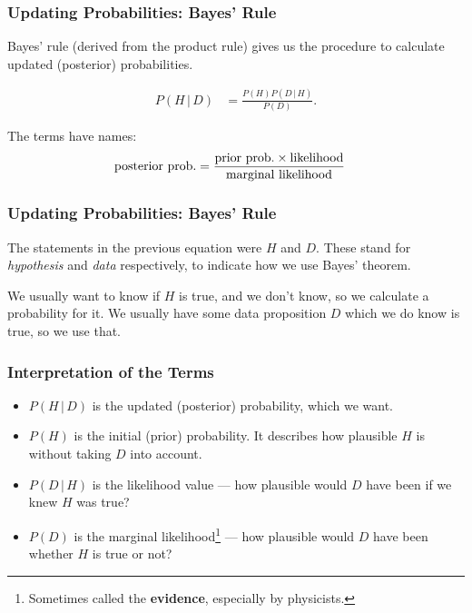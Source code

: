 \documentclass{beamer}
\newcommand{\given}{\,|\,}
\begin{document}
\begin{frame}
\frametitle{Updating Probabilities: Bayes' Rule}
Bayes' rule (derived from the product rule) gives us the procedure to
calculate updated (posterior) probabilities.

\begin{align}
P(H \given D) &= \frac{P(H) P(D\given H)}{P(D)}.
\end{align}

\pause
The terms have names:
\begin{align}
\textnormal{posterior prob.} &=
        \frac{\textnormal{prior prob.} \times \textnormal{likelihood}}{\textnormal{marginal likelihood}}
\end{align}

\end{frame}



\begin{frame}
\frametitle{Updating Probabilities: Bayes' Rule}
The statements in the previous equation were $H$ and $D$.
These stand for {\em hypothesis} and {\em data} respectively,
to indicate how we use Bayes' theorem.\\[0.5em]\pause

We usually want to know if $H$ is true, and we don't know,
so we calculate a probability for it. We usually have some
data proposition $D$ which we do know is true, so we use that.

\end{frame}


\begin{frame}
\frametitle{Interpretation of the Terms}

\begin{itemize}
\item $P(H\given D)$ is the updated (posterior) probability, which we
want.\pause
\item $P(H)$ is the initial (prior) probability. It describes
how plausible $H$ is without taking $D$ into account.\pause
\item $P(D \given H)$ is the likelihood value --- how plausible would $D$
have been if we knew $H$ was true?\pause
\item $P(D)$ is the marginal likelihood\footnote{Sometimes called the
{\bf evidence}, especially by physicists.} --- how plausible would $D$ have been
whether $H$ is true or not?
\end{itemize}

\end{frame}
\end{document}
